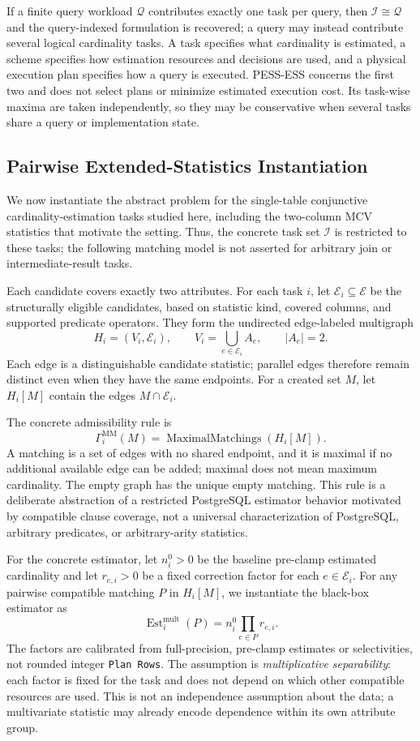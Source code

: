\documentclass[sigconf, nonacm]{acmart}
\newcommand{\E}{\mathcal{E}}
\begin{document}
If a finite query workload \(\mathcal Q\) contributes exactly one task per
query, then
\(\mathcal I\cong\mathcal Q\) and the query-indexed formulation is recovered;
a query may instead contribute several logical cardinality tasks.  A task
specifies what cardinality is estimated, a scheme specifies how estimation
resources and decisions are used, and a physical execution plan specifies
how a query is executed.  PESS-ESS concerns the first two and does not
select plans or minimize estimated execution cost.  Its task-wise maxima are
taken independently, so they may be conservative when several tasks share a
query or implementation state.

\subsection{Pairwise Extended-Statistics Instantiation}

We now instantiate the abstract problem for the single-table conjunctive
cardinality-estimation tasks studied here, including the two-column MCV
statistics that motivate the setting.  Thus, the concrete task set
\(\mathcal I\) is restricted to these tasks; the following matching model is
not asserted for arbitrary join or intermediate-result tasks.

Each candidate covers exactly two attributes.  For each task \(i\), let
\(\E_i\subseteq\E\) be the structurally eligible candidates, based on
statistic kind, covered columns, and supported predicate operators.  They
form the undirected edge-labeled multigraph
\[
  H_i=(V_i,\E_i),\qquad V_i=\bigcup_{e\in\E_i}A_e,\qquad |A_e|=2.
\]
Each edge is a distinguishable candidate statistic; parallel edges therefore
remain distinct even when they have the same endpoints.  For a created set
\(M\), let \(H_i[M]\) contain the edges \(M\cap\E_i\).

The concrete admissibility rule is
\[
  \boxed{\Gamma_i^{\mathrm{MM}}(M)=
    \operatorname{MaximalMatchings}(H_i[M]).}
\]
A matching is a set of edges with no shared endpoint, and it is maximal if
no additional available edge can be added; maximal does not mean maximum
cardinality.  The empty graph has the unique empty matching.  This rule is
a deliberate abstraction of a restricted PostgreSQL estimator behavior
motivated by compatible clause coverage, not a universal characterization of
PostgreSQL, arbitrary predicates, or arbitrary-arity statistics.

For the concrete estimator, let \(n_i^0>0\) be the baseline pre-clamp
estimated cardinality and let \(r_{e,i}>0\) be a fixed correction factor for
each \(e\in\E_i\).  For any pairwise compatible matching \(P\) in \(H_i[M]\),
we instantiate the black-box estimator as
\[
  \boxed{\operatorname{Est}_i^{\mathrm{mult}}(P)
    =n_i^0\prod_{e\in P}r_{e,i}}.
\]
The factors are calibrated from full-precision, pre-clamp estimates or
selectivities, not rounded integer \texttt{Plan Rows}.  The assumption is
\emph{multiplicative separability}: each factor is fixed for the task and
does not depend on which other compatible resources are used.  This is not
an independence assumption about the data; a multivariate statistic may
already encode dependence within its own attribute group.
\end{document}
